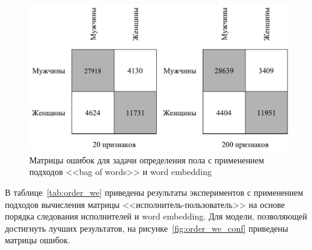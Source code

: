 \begin{figure}[!h]
\caption{Матрицы ошибок для задачи определения пола с
         применением подходов <<bag of words>> и
         word embedding}
\label{fig:bow_we_conf}
\centering
\includegraphics[scale=0.8]{figs/bow-we-confusion.pdf}
\end{figure}

В таблице~\ref{tab:order_we} приведены результаты
экспериментов с применением подходов вычисления матрицы
<<исполнитель-пользователь>> на основе порядка следования
исполнителей и word embedding. Для модели, позволяющей
достигнуть лучших результатов, на рисунке~\ref{fig:order_we_conf}
приведены матрицы ошибок.

